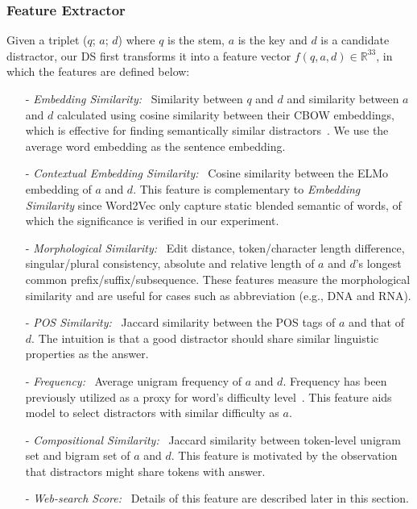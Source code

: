 \subsubsection{Feature Extractor}
\label{sec:FE}
Given a triplet ($q$; $a$; $d$) where $q$ is the stem, $a$ is the key and $d$ is a candidate distractor, 
our DS first transforms it into a feature vector $f(q,a,d)\in \mathbb{R}^{33}$, in which the features are defined below:
\begin{itemize}
	\item[-] \textit{Embedding Similarity:} ~Similarity between $q$ and $d$ and similarity between $a$ and $d$ calculated using cosine similarity between their CBOW embeddings, which is effective for finding semantically similar distractors~\cite{guo2016questimator}. We use the average word embedding as the sentence embedding. 
\item[-] \textit{Contextual Embedding Similarity:} ~Cosine similarity between the ELMo~\cite{peters2018deep} embedding of $a$ and $d$. This feature is complementary to \textit{Embedding Similarity} since Word2Vec only capture static blended semantic of words, of which the significance is verified in our experiment.
\item[-] \textit{Morphological Similarity:} ~Edit distance, token/character length difference, singular/plural consistency, absolute and relative length of $a$ and $d$'s longest common prefix/suffix/subsequence. These features measure the morphological similarity and are useful for cases such as abbreviation 
(e.g., DNA and RNA). 
\item[-] \textit{POS Similarity:} ~Jaccard similarity between the 
POS tags of $a$ and that of $d$. The intuition is that a good distractor 
should share similar linguistic properties as the answer.
\item[-] \textit{Frequency:} ~Average unigram frequency of $a$ and $d$. Frequency has been previously utilized as a proxy for word's difficulty level~\cite{article}. This feature aids model to select distractors with similar difficulty as $a$.
\item[-] \textit{Compositional Similarity:} ~Jaccard similarity between token-level
unigram set and bigram set of $a$ and $d$. This feature is motivated by the observation that distractors might share tokens with answer.
	\item[-] \textit{Web-search Score:} ~Details of this feature are described later in this section.
\end{itemize} 

